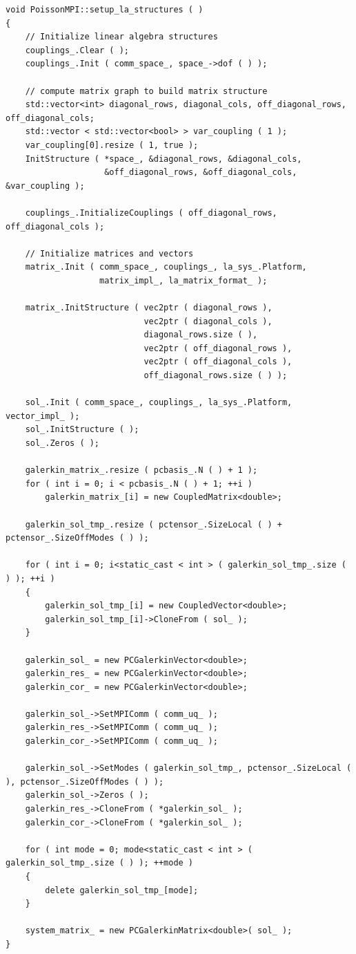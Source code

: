 \documentclass{article}
\begin{document}
\begin{lstlisting}
void PoissonMPI::setup_la_structures ( )
{
    // Initialize linear algebra structures
    couplings_.Clear ( );
    couplings_.Init ( comm_space_, space_->dof ( ) );

    // compute matrix graph to build matrix structure
    std::vector<int> diagonal_rows, diagonal_cols, off_diagonal_rows, off_diagonal_cols;
    std::vector < std::vector<bool> > var_coupling ( 1 );
    var_coupling[0].resize ( 1, true );
    InitStructure ( *space_, &diagonal_rows, &diagonal_cols,
                    &off_diagonal_rows, &off_diagonal_cols, &var_coupling );

    couplings_.InitializeCouplings ( off_diagonal_rows, off_diagonal_cols );

    // Initialize matrices and vectors
    matrix_.Init ( comm_space_, couplings_, la_sys_.Platform,
                   matrix_impl_, la_matrix_format_ );

    matrix_.InitStructure ( vec2ptr ( diagonal_rows ),
                            vec2ptr ( diagonal_cols ),
                            diagonal_rows.size ( ),
                            vec2ptr ( off_diagonal_rows ),
                            vec2ptr ( off_diagonal_cols ),
                            off_diagonal_rows.size ( ) );

    sol_.Init ( comm_space_, couplings_, la_sys_.Platform, vector_impl_ );
    sol_.InitStructure ( );
    sol_.Zeros ( );

    galerkin_matrix_.resize ( pcbasis_.N ( ) + 1 );
    for ( int i = 0; i < pcbasis_.N ( ) + 1; ++i )
        galerkin_matrix_[i] = new CoupledMatrix<double>;

    galerkin_sol_tmp_.resize ( pctensor_.SizeLocal ( ) + pctensor_.SizeOffModes ( ) );

    for ( int i = 0; i<static_cast < int > ( galerkin_sol_tmp_.size ( ) ); ++i )
    {
        galerkin_sol_tmp_[i] = new CoupledVector<double>;
        galerkin_sol_tmp_[i]->CloneFrom ( sol_ );
    }

    galerkin_sol_ = new PCGalerkinVector<double>;
    galerkin_res_ = new PCGalerkinVector<double>;
    galerkin_cor_ = new PCGalerkinVector<double>;

    galerkin_sol_->SetMPIComm ( comm_uq_ );
    galerkin_res_->SetMPIComm ( comm_uq_ );
    galerkin_cor_->SetMPIComm ( comm_uq_ );

    galerkin_sol_->SetModes ( galerkin_sol_tmp_, pctensor_.SizeLocal ( ), pctensor_.SizeOffModes ( ) );
    galerkin_sol_->Zeros ( );
    galerkin_res_->CloneFrom ( *galerkin_sol_ );
    galerkin_cor_->CloneFrom ( *galerkin_sol_ );

    for ( int mode = 0; mode<static_cast < int > ( galerkin_sol_tmp_.size ( ) ); ++mode )
    {
        delete galerkin_sol_tmp_[mode];
    }

    system_matrix_ = new PCGalerkinMatrix<double>( sol_ );
}
\end{lstlisting}
\end{document}
